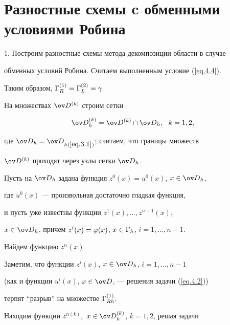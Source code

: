 \section{Разностные схемы c обменными условиями Робина}


\label{section.5}








1. Построим разностные схемы метода декомпозиции области в случае


обменных условий Робина. Считаем выполненным условие (\ref{eq.4.4}).


Таким образом, $\Gamma^{(1)}_R=\Gamma^{(2)}_L=\gamma$.





На множествах $\od^{(k)}$ строим сетки


\begin{equation} \label{eq.5.1}


\od^{(k)}_h=\od^{(k)}\cap \od_h, \ \ k=1,2,


\end{equation}


где $\od_h=\od_{h(\ref{eq.3.1})}$; считаем, что границы множеств


$\od^{(k)}$ проходят через узлы сетки $\od_h$.





Пусть на $\od_h$ задана функция $z^0(x)=u^0(x)$, $x \in \od_h$,


где $u^0(x)$ --- произвольная достаточно гладкая функция,


и пусть уже известны функции $z^1(x), \dotsc , z^{n-1}(x)$,


$x \in \od_h$, причем $z^i(x)=\varphi(x)$, $x \in \Gamma_h$, $i=1,\dotsc, n-1$.


Найдем функцию $z^n(x)$.


Заметим, что функции $z^i(x)$, $x\in \od_h$, $i=1, \dotsc, n-1$


(как и функции $u^i(x)$, $x \in \od$, --- решения задачи (\ref{eq.4.2}))


терпят ``разрыв'' на множестве $\Gamma^{(1)}_{Rh}$.





Находим функции $z^{n(k)}$, $\, x \in \od^{(k)}_h$, $k=1,2$, решая задачи



